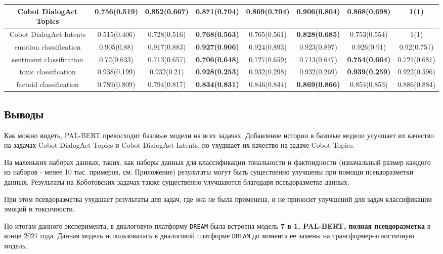 \begin{table}[htbp]
{\begin{tabular}{|c||c|c|c|c|c|c|c|}
\hline
Cobot DialogAct Topics & 0.756(0.519) & 0.852(0.667) & \textbf{0.871(0.704)} & 0.869(0.704) & \textbf{0.906(0.804)} & 0.868(0.698) & 1(1) \\
\hline
Cobot DialogAct Intents & 0.515(0.406) & 0.728(0.516) & \textbf{0.768(0.563)} & 0.765(0.561) & \textbf{0.828(0.685)} & 0.753(0.554) & 1(1) \\
\hline
emotion classification & 0.905(0.88) & 0.917(0.883) & \textbf{0.927(0.906)} & 0.924(0.893) & 0.923(0.897) & 0.926(0.91) & 0.92(0.751) \\
\hline
sentiment classification & 0.72(0.633) & 0.713(0.657) & \textbf{0.706(0.648)} & 0.727(0.659) & 0.713(0.647) & \textbf{0.754(0.664)} & 0.721(0.681) \\
\hline
toxic classification & 0.938(0.199) & 0.932(0.21) & \textbf{0.928(0.253)} & 0.932(0.298) & 0.932(0.269) & \textbf{0.939(0.259)} & 0.922(0.596) \\
\hline
factoid classification & 0.789(0.809) & 0.794(0.817) & \textbf{0.834(0.831)} & 0.846(0.844) & \textbf{0.869(0.866)} & 0.854(0.853) & 0.886(0.884) \\
\hline
\end{tabular}
}
\end{table}

\subsection{Выводы}
Как можно видеть, PAL-BERT превосходит базовые модели на всех задачах. Добавление истории в базовые модели улучшает их качество на задачах Cobot DialogAct Topics и Cobot DialogAct Intents, но ухудшает их качество на задаче Cobot Topics.

На маленьких наборах данных, таких, как наборы данных для классификации тональности и фактоидности (изначальный размер каждого из наборов - менее 10 тыс. примеров, см. Приложение) результаты могут быть существенно улучшены при помощи псевдоразметки данных. Результаты на Коботовских задачах также существенно улучшаются благодаря псевдоразметке данных.

При этом псевдоразметка ухудшает результаты для задач, где она не была применена, и не приносит улучшений для задач классификации эмоций и токсичности.

По итогам данного эксперимента, в диалоговую платформу \texttt{DREAM} была встроена модель \textbf{7 в 1, PAL-BERT, полная псевдоразметка} в конце 2021 года. Данная модель использовалась в диалоговой платформе \texttt{DREAM} до момента ее замены на трансформер-агностичную модель.

